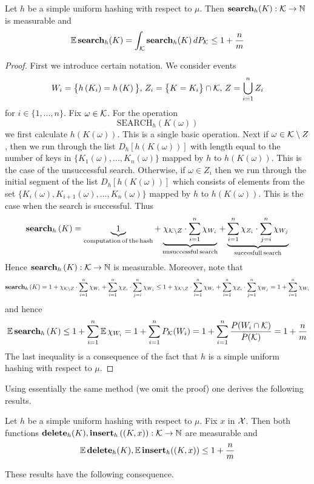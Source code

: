 \begin{theorem}\label{theorem:simple_uniform_hashing_expected_cost_for_search}
Let $h$ be a simple uniform hashing with respect to $\mu$. Then $\mathbf{search}_h(K):{\mathcal K}\rightarrow {\mathbb N}$ is measurable and
$$\mathbb{E}\,\mathbf{search}_h(K) = \int_{{\mathcal K}}\mathbf{search}_h(K)\,dP_{{\mathcal K}} \leq 1 + \frac{n}{m}$$
\end{theorem}
\begin{proof}
First we introduce certain notation. We consider events
$$W_{i} = \big\{h\left(K_i\right) = h\left(K\right)\big\},\,Z_i = \big\{K = K_i\big\}\cap {\mathcal K},\,Z = \bigcup_{i=1}^nZ_i$$
for $i\in \{1,...,n\}$. Fix $\omega \in {\mathcal K}$. For the operation
$$\mathrm{SEARCH}_h(K(\omega))$$
we first calculate $h(K(\omega))$. This is a single basic operation. Next if $\omega \in {\mathcal K}\setminus Z$, then we run through the list $D_h[h(K(\omega))]$ with length equal to the number of keys in $\big\{K_1(\omega),...,K_n(\omega)\big\}$ mapped by $h$ to $h(K(\omega))$. This is the case of the unsuccessful search. Otherwise, if $\omega \in Z_i$ then we run through the initial segment of the list $D_h[h(K(\omega))]$ which consists of elements from the set $\big\{K_i(\omega),K_{i+1}(\omega),...,K_n(\omega)\big\}$ mapped by $h$ to $h(K(\omega))$. This is the case when the search is successful. Thus
$$\mathbf{search}_h\left(K\right) = \underbrace{1}_{\mathrm{computation\,of\,the\,hash}} + \underbrace{\chi_{{\mathcal K}\setminus Z}\cdot\sum_{i=1}^n \chi_{W_{i}}}_{\mathrm{unsuccessful\,search}} + \underbrace{\sum_{i=1}^n\chi_{Z_i}\cdot\sum_{j = i}^n \chi_{W_{j}}}_{\mathrm{succesfull\,search}}$$
Hence $\mathbf{search}_h\left(K\right):{\mathcal K}\rightarrow {\mathbb N}$ is measurable. Moreover, note that
$$\mathbf{search}_h\left(K\right) = 1 + \chi_{{\mathcal K}\setminus Z}\cdot \sum_{i=1}^n \chi_{W_{i}} + \sum_{i=1}^n\chi_{Z_i}\cdot\sum_{j = i}^n \chi_{W_{j}} \leq 1 + \chi_{{\mathcal K}\setminus Z}\cdot \sum_{i=1}^n \chi_{W_{i}} + \sum_{i=1}^n\chi_{Z_i}\cdot\sum_{j = 1}^n \chi_{W_{j}} = 1 +  \sum_{i=1}^n \chi_{W_{i}}$$
and hence
$$\mathbb{E}\,\mathbf{search}_h\left(K\right) \leq 1 +  \sum_{i=1}^n \mathbb{E}\,\chi_{W_{i}} = 1 + \sum_{i=1}^nP_{{\mathcal K}}(W_i) = 1 + \sum_{i=1}^n\frac{P(W_i\cap {\mathcal K})}{P({\mathcal K})} = 1 + \frac{n}{m}$$
The last inequality is a consequence of the fact that $h$ is a simple uniform hashing with respect to $\mu$.
\end{proof}
\noindent
Using essentially the same method (we omit the proof) one derives the following results.

\begin{theorem}\label{theorem:simple_uniform_hashing_expected_costs_of_delete_and_insert}
Let $h$ be a simple uniform hashing with respect to $\mu$. Fix $x$ in ${\mathcal X}$. Then both functions $\mathbf{delete}_h(K),\mathbf{insert}_h\left((K,x)\right):{\mathcal K}\rightarrow {\mathbb N}$ are measurable and
$$\mathbb{E}\,\mathbf{delete}_h(K), \mathbb{E}\,\mathbf{insert}_h((K,x))  \leq 1 + \frac{n}{m}$$
\end{theorem}
\noindent
These results have the following consequence.

